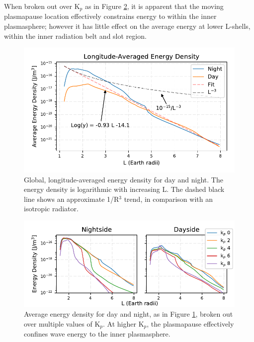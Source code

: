 When broken out over K$_p$ as in Figure \ref{fig:energy_density_vs_L_multiple_kp}, it is apparent that the moving plasmapause location effectively constrains energy to within the inner plasmasphere; however it has little effect on the average energy at lower L-shells, within the inner radiation belt and slot region.



\begin{figure}[h!]
\begin{center}
\includegraphics{figures/density_vs_L_with_fit.pdf}
\caption[Average energy density vs L, longitude-averaged]{Global, longitude-averaged energy density for day and night. The energy density is logarithmic with increasing L. The dashed black line shows an approximate 1/R$^3$ trend, in comparison with an isotropic radiator.}
\label{fig:energy_density_vs_L_trendline}
\end{center}
\end{figure}

\begin{figure}[h!]
\begin{center}
\includegraphics{figures/density_vs_L_multiple_kp.pdf}
\caption[Average energy density vs L for multiple K$_p$]{Average energy density for day and night, as in Figure \ref{fig:energy_density_vs_L_trendline}, broken out over multiple values of K$_p$. At higher K$_p$, the plasmapause effectively confines wave energy to the inner plasmasphere.}
\label{fig:energy_density_vs_L_multiple_kp}
\end{center}
\end{figure}

